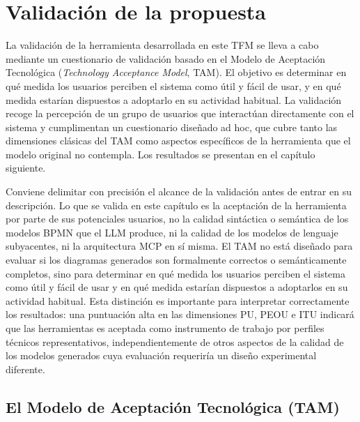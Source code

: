 


\chapter{Validación de la propuesta}
\label{cap:validacion}

La validación de la herramienta desarrollada en este TFM se lleva a cabo mediante un cuestionario de validación basado en el Modelo de Aceptación Tecnológica (\textit{Technology Acceptance Model}, TAM). El objetivo es determinar en qué medida los usuarios perciben el sistema como útil y fácil de usar, y en qué medida estarían dispuestos a adoptarlo en su actividad habitual. La validación recoge la percepción de un grupo de usuarios que interactúan directamente con el sistema y cumplimentan un cuestionario diseñado ad hoc, que cubre tanto las dimensiones clásicas del TAM como aspectos específicos de la herramienta que el modelo original no contempla. Los resultados se presentan en el capítulo siguiente.

Conviene delimitar con precisión el alcance de la validación antes de entrar en su descripción. Lo que se valida en este capítulo es la aceptación de la herramienta por parte de sus potenciales usuarios, no la calidad sintáctica o semántica de los modelos BPMN que el LLM produce, ni la calidad de los modelos de lenguaje subyacentes, ni la arquitectura MCP en sí misma. El TAM no está diseñado para evaluar si los diagramas generados son formalmente correctos o semánticamente completos, sino para determinar en qué medida los usuarios perciben el sistema como útil y fácil de usar y en qué medida estarían dispuestos a adoptarlos en su actividad habitual. Esta distinción es importante para interpretar correctamente los resultados: una puntuación alta en las dimensiones PU, PEOU e ITU indicará que las herramientas es aceptada como instrumento de trabajo por perfiles técnicos representativos, independientemente de otros aspectos de la calidad de los modelos generados cuya evaluación requeriría un diseño experimental diferente. 

\section{El Modelo de Aceptación Tecnológica (TAM)}
\label{sec:tam}

